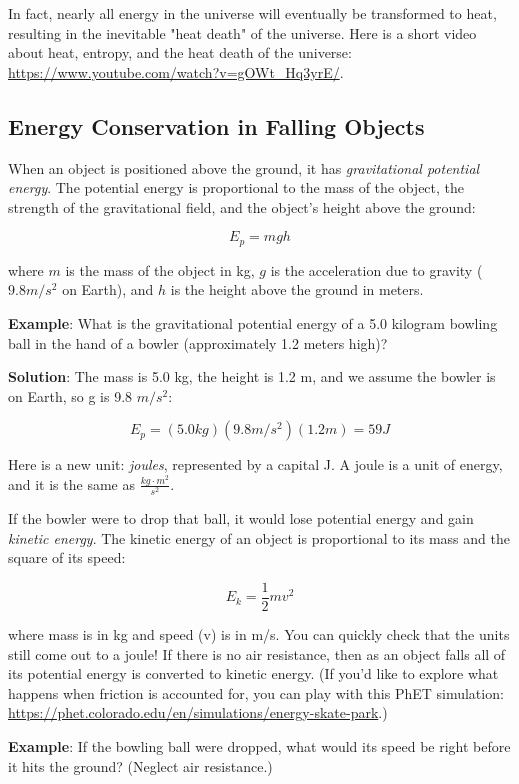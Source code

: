In fact, nearly all energy in the universe will eventually be transformed to heat,
resulting in the inevitable "heat death" of the universe. Here is a short video 
about heat, entropy, and the heat death of the universe: 
\url{https://www.youtube.com/watch?v=gOWt_Hq3yrE/}. 

\subsection{Energy Conservation in Falling Objects}
When an object is positioned above the ground, it has \textit{gravitational 
potential energy}. 
The potential energy is proportional to the mass of the object, the strength of 
the gravitational field, and the object's height above the ground:

$$E_{p} = mgh$$

where $m$ is the mass of the object in kg, $g$ is the acceleration due to gravity 
($9.8 m/s^2$ on Earth), and $h$ is the height above the ground in meters. 

\textbf{Example}: What is the gravitational potential energy of a 5.0 kilogram 
bowling ball in the hand of a bowler (approximately 1.2 meters high)?

\textbf{Solution}: The mass is 5.0 kg, the height is 1.2 m, and we assume the 
bowler is on Earth, so g is 9.8 $m/s^2$:

$$E_{p} = \left( 5.0 kg \right) \left( 9.8 m/s^2 \right) \left( 1.2 m \right) = 59 J$$

Here is a new unit: \textit{joules}, represented by a capital J. A joule is a 
unit of energy, and it is the same as $\frac{kg \cdot m^2}{s^2}$. 

If the bowler were to drop that ball, it would lose potential energy and gain 
\textit{kinetic energy}. The kinetic energy of an object 
is proportional to its mass and the square of its speed:

$$E_{k} = \frac{1}{2}mv^2$$

where mass is in kg and speed (v) is in m/s. You can quickly check that the units 
still come out to a joule! If there is no air resistance, then as an object falls 
all of its potential energy is converted to kinetic energy. (If you'd like to 
explore what happens when friction is accounted for, you can play with this PhET 
simulation: \url{https://phet.colorado.edu/en/simulations/energy-skate-park}.)

\textbf{Example}: If the bowling ball were dropped, what would its speed be right 
before it hits the ground? (Neglect air resistance.)

